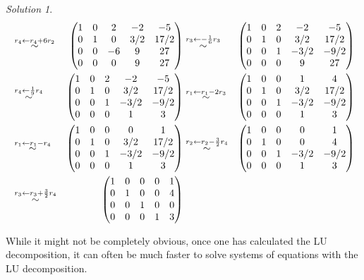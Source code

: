 \documentclass[
]{book}
\theoremstyle{definition}
\theoremstyle{definition}
\theoremstyle{definition}
\theoremstyle{remark}
\newtheorem*{solution}{Solution}
\begin{document}
\begin{solution}
\[\begin{aligned}
& \stackrel{r_4 \leftarrow r_4 + 6 r_2}{\huge \sim} & \begin{pmatrix} 1 & 0 & 2 & -2 & -5 \\ 0 & 1 & 0 & 3/2 & 17/2 \\ 0 & 0 & -6 & 9 & 27 \\ 0 & 0 & 0 & 9 & 27 \end{pmatrix} & 
\stackrel{r_3 \leftarrow - \frac{1}{6} r_3}{\huge \sim} & \begin{pmatrix} 1 & 0 & 2 & -2 & -5 \\ 0 & 1 & 0 & 3/2 & 17/2 \\ 0 & 0 & 1 & -3/2 & -9/2 \\ 0 & 0 & 0 & 9 & 27 \end{pmatrix}\\
& \stackrel{r_4 \leftarrow \frac{1}{9} r_4}{\huge \sim} & \begin{pmatrix} 1 & 0 & 2 & -2 & -5 \\ 0 & 1 & 0 & 3/2 & 17/2 \\ 0 & 0 & 1 & -3/2 & -9/2 \\ 0 & 0 & 0 & 1 & 3 \end{pmatrix} & \stackrel{r_1 \leftarrow r_1 - 2 r_3}{\huge \sim} & \begin{pmatrix} 1 & 0 & 0 & 1 & 4 \\ 0 & 1 & 0 & 3/2 & 17/2 \\ 0 & 0 & 1 & -3/2 & -9/2 \\ 0 & 0 & 0 & 1 & 3 \end{pmatrix} \\
& \stackrel{r_1 \leftarrow r_1 - r_4}{\huge \sim} & \begin{pmatrix} 1 & 0 & 0 & 0 & 1 \\ 0 & 1 & 0 & 3/2 & 17/2 \\ 0 & 0 & 1 & -3/2 & -9/2 \\ 0 & 0 & 0 & 1 & 3 \end{pmatrix} & 
\stackrel{r_2 \leftarrow r_2 - \frac{3}{2} r_4}{\huge \sim} & \begin{pmatrix} 1 & 0 & 0 & 0 & 1 \\ 0 & 1 & 0 & 0 & 4 \\ 0 & 0 & 1 & -3/2 & -9/2 \\ 0 & 0 & 0 & 1 & 3 \end{pmatrix} \\
& \stackrel{r_3 \leftarrow r_3 + \frac{3}{2} r_4}{\huge \sim} & \begin{pmatrix} 1 & 0 & 0 & 0 & 1 \\ 0 & 1 & 0 & 0 & 4 \\ 0 & 0 & 1 & 0 & 0 \\ 0 & 0 & 0 & 1 & 3 \end{pmatrix}  
\end{aligned}
\]

While it might not be completely obvious, once one has calculated the LU decomposition, it can often be much faster to solve systems of equations with the LU decomposition.

\end{solution}
\end{document}

